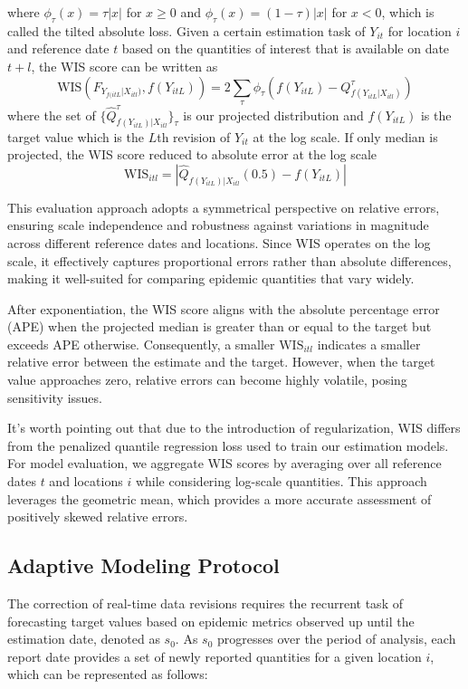 where $\phi_{\tau}(x) = \tau|x|$ for $x\geq 0$ and $\phi_{\tau}(x) = (1-\tau)|x|$ for $x<0$, which is called the tilted absolute loss\cite{mcdonald2021can}. Given a certain estimation task of $Y_{it}$ for location $i$ and reference date $t$ based on the quantities of interest that is available on date $t+l$, the WIS score can be written as 
$$
    \mbox{WIS}(F_{Y_{f(itL}|X_{itl})}, f(Y_{itL})) = 2\sum_{\tau}\phi_{\tau}(f(Y_{itL}) - Q_{f(Y_{itL}|X_{itl})}^{\tau})
$$
where the set of $\{\hat Q_{f(Y_{itL})|X_{itl}}^{\tau} \}_{\tau}$ is our projected distribution and $f(Y_{itL})$ is the target value which is the $L$th revision of $Y_{it}$ at the log scale. If only median is projected, the WIS score reduced to absolute error at the log scale
$$ \text{WIS}_{itl} = |\hat{Q}_{f(Y_{itL})|X_{itl}}(0.5) - f(Y_{itL})|  $$

This evaluation approach adopts a symmetrical perspective on relative errors, ensuring scale independence and robustness against variations in magnitude across different reference dates and locations. Since WIS operates on the log scale, it effectively captures proportional errors rather than absolute differences, making it well-suited for comparing epidemic quantities that vary widely.

After exponentiation, the WIS score aligns with the absolute percentage error (APE) when the projected median is greater than or equal to the target but exceeds APE otherwise. Consequently, a smaller $\text{WIS}_{itl}$ indicates a smaller relative error between the estimate and the target. However, when the target value approaches zero, relative errors can become highly volatile, posing sensitivity issues.

It's worth pointing out that due to the introduction of regularization, WIS differs from the penalized quantile regression loss used to train our estimation models. For model evaluation, we aggregate WIS scores by averaging over all reference dates $t$ and locations $i$ while considering log-scale quantities. This approach leverages the geometric mean, which provides a more accurate assessment of positively skewed relative errors.

\subsection{Adaptive Modeling Protocol}

The correction of real-time data revisions requires the recurrent task of forecasting target values based on epidemic metrics observed up until the estimation date, denoted as $s_0$. As $s_0$ progresses over the period of analysis, each report date provides a set of newly reported quantities for a given location $i$, which can be represented as follows:


